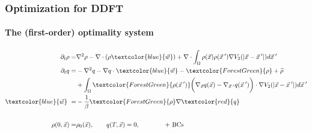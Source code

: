 \documentclass[aspectratio=169,xcolor=dvipsnames]{beamer}
\begin{document}
\begin{frame}
	\frametitle{Optimization for DDFT}
	\framesubtitle{The (first-order) optimality system}
	\begin{align*}
	 \partial_t \rho =& \nabla^2 \rho - \nabla \cdot (\rho \textcolor{blue}{\vec{w}})
	+ \nabla \cdot \int_\Omega \rho(\vec{x}) \rho(\vec{x}\hspace{0.2em}') \nabla V_2(|\vec{x}-\vec{x}\hspace{0.2em}'|)d\vec{x}\hspace{0.2em}'  \\
	\partial_t q =& -\nabla^2 q - \nabla q \cdot \textcolor{blue}{\vec{w}} - \textcolor{ForestGreen}{\rho} + \widehat \rho \\
	&+ \int_\Omega \textcolor{ForestGreen}{\rho(\vec{x}\hspace{0.2em}')} \bigg(\nabla_{\vec{x}} q(\vec{x}) - \nabla_{\vec{x}\hspace{0.2em}'} q(\vec{x}\hspace{0.2em}')\bigg)\cdot  \nabla V_2(|\vec{x}-\vec{x}\hspace{0.2em}'|)d\vec{x}\hspace{0.2em}' \\
    \textcolor{blue}{\vec{w}} \ =& - \frac{1}{\beta}\textcolor{ForestGreen}{\rho} \nabla  \textcolor{red}{q}\\
    \\
    \rho(0,\vec{x})=&\rho_0(\vec{x}), \qquad q(T,\vec{x})= 0, \qquad \qquad \text{+ BCs}\\
	\end{align*}
\end{frame}
\end{document}
